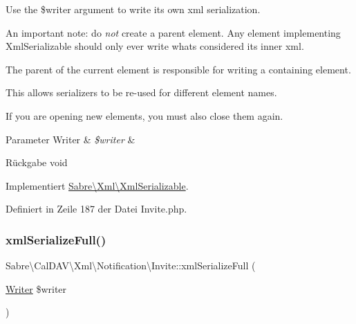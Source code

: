 Use the \$writer argument to write its own xml serialization.

An important note\+: do {\itshape not} create a parent element. Any element implementing Xml\+Serializable should only ever write what\textquotesingle{}s considered its \textquotesingle{}inner xml\textquotesingle{}.

The parent of the current element is responsible for writing a containing element.

This allows serializers to be re-\/used for different element names.

If you are opening new elements, you must also close them again.


\begin{DoxyParams}[1]{Parameter}
Writer & {\em \$writer} & \\
\hline
\end{DoxyParams}
\begin{DoxyReturn}{Rückgabe}
void 
\end{DoxyReturn}


Implementiert \mbox{\hyperlink{interface_sabre_1_1_xml_1_1_xml_serializable_aa78f3ee43aa699be8347181653a53d8c}{Sabre\textbackslash{}\+Xml\textbackslash{}\+Xml\+Serializable}}.



Definiert in Zeile 187 der Datei Invite.\+php.

\mbox{\label{class_sabre_1_1_cal_d_a_v_1_1_xml_1_1_notification_1_1_invite_ac50ef5807224594c95d33d939e4f1bb3}} 
\subsubsection{\texorpdfstring{xml\+Serialize\+Full()}{xmlSerializeFull()}}
{\footnotesize\ttfamily Sabre\textbackslash{}\+Cal\+D\+A\+V\textbackslash{}\+Xml\textbackslash{}\+Notification\textbackslash{}\+Invite\+::xml\+Serialize\+Full (\begin{DoxyParamCaption}\item[{\mbox{\hyperlink{class_sabre_1_1_xml_1_1_writer}{Writer}}}]{\$writer }\end{DoxyParamCaption})}

